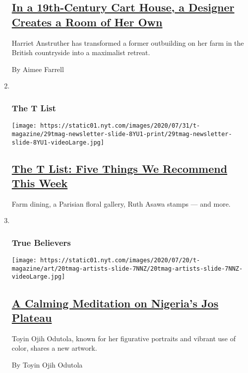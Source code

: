 \begin{enumerate}
  \hypertarget{in-a-19th-century-cart-house-a-designer-creates-a-room-of-her-own}{%
  \subsection{\texorpdfstring{\href{/2020/07/31/t-magazine/design-bothy-anstruther.html}{In
  a 19th-Century Cart House, a Designer Creates a Room of Her
  Own}}{In a 19th-Century Cart House, a Designer Creates a Room of Her Own}}\label{in-a-19th-century-cart-house-a-designer-creates-a-room-of-her-own}}

  Harriet Anstruther has transformed a former outbuilding on her farm in
  the British countryside into a maximalist retreat.

  By Aimee Farrell
\item ~
  \hypertarget{the-t-list-1}{%
  \subsubsection{The T List}\label{the-t-list-1}}

  \texttt{[image: https://static01.nyt.com/images/2020/07/31/t-magazine/29tmag-newsletter-slide-8YU1-print/29tmag-newsletter-slide-8YU1-videoLarge.jpg]}

  \hypertarget{the-t-list-five-things-we-recommend-this-week-1}{%
  \subsection{\texorpdfstring{\href{/2020/07/30/t-magazine/the-t-list-five-things-we-recommend-this-week.html}{The
  T List: Five Things We Recommend This
  Week}}{The T List: Five Things We Recommend This Week}}\label{the-t-list-five-things-we-recommend-this-week-1}}

  Farm dining, a Parisian floral gallery, Ruth Asawa stamps --- and
  more.
\item ~
  \hypertarget{true-believers}{%
  \subsubsection{True Believers}\label{true-believers}}

  \texttt{[image: https://static01.nyt.com/images/2020/07/20/t-magazine/art/20tmag-artists-slide-7NNZ/20tmag-artists-slide-7NNZ-videoLarge.jpg]}

  \hypertarget{a-calming-meditation-on-nigerias-jos-plateau}{%
  \subsection{\texorpdfstring{\href{/2020/07/22/t-magazine/toyin-ojih-odutola.html}{A
  Calming Meditation on Nigeria's Jos
  Plateau}}{A Calming Meditation on Nigeria's Jos Plateau}}\label{a-calming-meditation-on-nigerias-jos-plateau}}

  Toyin Ojih Odutola, known for her figurative portraits and vibrant use
  of color, shares a new artwork.

  By Toyin Ojih Odutola
\end{enumerate}

